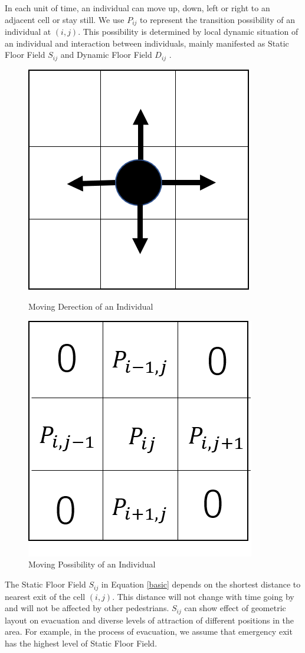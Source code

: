 \documentclass{mcmthesis}
\begin{document}
In each unit of time, an individual can move up, down, left or right to an adjacent cell or stay still. We use $P_{ij}$ to represent the transition possibility of an individual at $(i,j)$. This possibility is determined by local dynamic situation of an individual and interaction between individuals, mainly manifested as Static Floor Field $S_{ij}$ and Dynamic Floor Field  $D_{ij}$ . \cite{103}
\begin{figure}[H]
\parbox[b]{.5\textwidth}{
\includegraphics[scale=0.5]{move-direction.png}
\centering\captionsetup{font=small, labelfont=bf}\caption{Moving Derection of an Individual}
}
\parbox[b]{.5\textwidth}{
\includegraphics[scale=0.5]{move-possibility.png}
\centering\captionsetup{font=small, labelfont=bf}\caption{Moving Possibility of an Individual}
}
\end{figure}
The Static Floor Field $S_{ij}$ in Equation \eqref{basic} depends on the shortest distance to nearest exit of the cell $(i,j)$. This distance will not change with time going by and will not be affected by other pedestrians. $S_{ij}$ can show effect of geometric layout on evacuation and diverse levels of attraction of different positions in the area. For example, in the process of evacuation, we assume that emergency exit has the highest level of Static Floor Field. 
\end{document}
